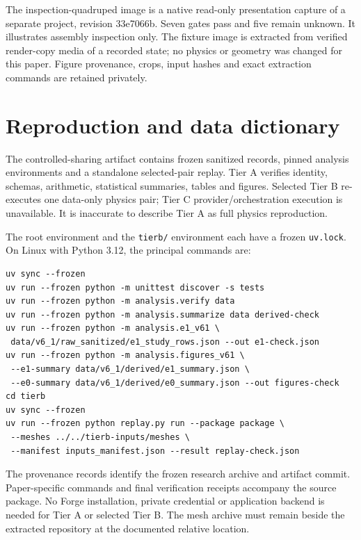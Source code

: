 The inspection-quadruped image is a native read-only presentation capture of a separate project, revision 33e7066b. Seven gates pass and five remain unknown. It illustrates assembly inspection only. The fixture image is extracted from verified render-copy media of a recorded state; no physics or geometry was changed for this paper. Figure provenance, crops, input hashes and exact extraction commands are retained privately.

\section{Reproduction and data dictionary}
The controlled-sharing artifact contains frozen sanitized records, pinned analysis environments and a standalone selected-pair replay. Tier A verifies identity, schemas, arithmetic, statistical summaries, tables and figures. Selected Tier B re-executes one data-only physics pair; Tier C provider/orchestration execution is unavailable. It is inaccurate to describe Tier A as full physics reproduction.

The root environment and the \texttt{tierb/} environment each have a frozen \texttt{uv.lock}. On Linux with Python 3.12, the principal commands are:
\begin{verbatim}
uv sync --frozen
uv run --frozen python -m unittest discover -s tests
uv run --frozen python -m analysis.verify data
uv run --frozen python -m analysis.summarize data derived-check
uv run --frozen python -m analysis.e1_v61 \
 data/v6_1/raw_sanitized/e1_study_rows.json --out e1-check.json
uv run --frozen python -m analysis.figures_v61 \
 --e1-summary data/v6_1/derived/e1_summary.json \
 --e0-summary data/v6_1/derived/e0_summary.json --out figures-check
cd tierb
uv sync --frozen
uv run --frozen python replay.py run --package package \
 --meshes ../../tierb-inputs/meshes \
 --manifest inputs_manifest.json --result replay-check.json
\end{verbatim}
The provenance records identify the frozen research archive and artifact commit. Paper-specific commands and final verification receipts accompany the source package. No Forge installation, private credential or application backend is needed for Tier A or selected Tier B. The mesh archive must remain beside the extracted repository at the documented relative location.

